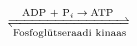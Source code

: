 \documentclass[preview]{standalone}
\begin{document}
\begin{align*}
\xrightleftharpoons[\text{Fosfoglütseraadi kinaas}]{\text{ADP + P}_i \:\rightarrow\: \text{ATP}}
\end{align*}
\end{document}
